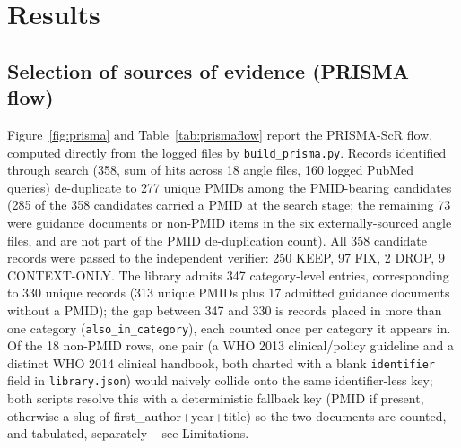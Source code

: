 \documentclass[11pt]{article}
\begin{document}
\section{Results}

\subsection{Selection of sources of evidence (PRISMA flow)}
Figure~\ref{fig:prisma} and Table~\ref{tab:prismaflow} report the PRISMA-ScR flow, computed
directly from the logged files by \texttt{build\_prisma.py}. Records identified through search
(358, sum of hits across 18 angle files, 160 logged PubMed queries) de-duplicate to 277 unique
PMIDs among the PMID-bearing candidates (285 of the 358 candidates carried a PMID at the search
stage; the remaining 73 were guidance documents or non-PMID items in the six externally-sourced
angle files, and are not part of the PMID de-duplication count). All 358 candidate records were
passed to the independent verifier: 250 KEEP, 97 FIX, 2 DROP, 9 CONTEXT-ONLY. The library admits
347 category-level entries, corresponding to 330 unique records (313 unique PMIDs plus 17 admitted
guidance documents without a PMID); the gap between 347 and 330 is records placed in more than one
category (\texttt{also\_in\_category}), each counted once per category it appears in. Of the 18
non-PMID rows, one pair (a WHO 2013 clinical/policy guideline and a distinct WHO 2014 clinical
handbook, both charted with a blank \texttt{identifier} field in \texttt{library.json}) would
naively collide onto the same identifier-less key; both scripts resolve this with a deterministic
fallback key (PMID if present, otherwise a slug of first\_author+year+title) so the two documents
are counted, and tabulated, separately -- see Limitations.
\end{document}
